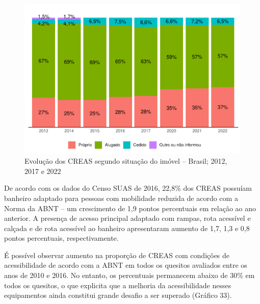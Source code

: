 \documentclass[
  brazilian]{report}
\begin{document}
\begin{figure}
\includegraphics{Censo-SUAS-2022_files/figure-latex/creas-situacao-1} \caption[Evolução dos CREAS segundo situação do imóvel – Brasil]{Evolução dos CREAS segundo situação do imóvel – Brasil; 2012, 2017 e 2022}\label{fig:creas-situacao}
\end{figure}

De acordo com os dados do Censo SUAS de 2016, 22,8\% dos CREAS possuíam
banheiro adaptado para pessoas com mobilidade reduzida de acordo com a
Norma da ABNT -- um crescimento de 1,9 pontos percentuais em relação ao
ano anterior. A presença de acesso principal adaptado com rampas, rota
acessível e calçada e de rota acessível ao banheiro apresentaram aumento
de 1,7, 1,3 e 0,8 pontos percentuais, respectivamente.

É possível observar aumento na proporção de CREAS com condições de
acessibilidade de acordo com a ABNT em todos os quesitos avaliados entre
os anos de 2010 e 2016. No entanto, os percentuais permanecem abaixo de
30\% em todos os quesitos, o que explicita que a melhoria da
acessibilidade nesses equipamentos ainda constitui grande desafio a ser
superado (Gráfico 33).
\end{document}
